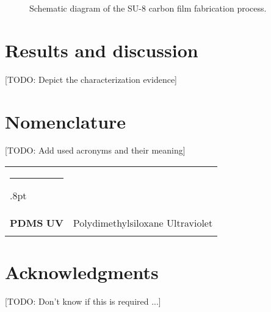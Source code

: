\documentclass[3p,,preprint,12pt]{elsarticle}
\makeatletter
\def\hlinewd#1{%
  \noalign{\ifnum0=`}\fi\hrule \@height #1%
  \futurelet\reserved@a\@xhline}
\def\tbltoprule{\hlinewd{.8pt}\\[-12pt]}
\def\tblbottomrule{\noalign{\vspace*{6pt}}\hline\noalign{\vspace*{2pt}}}
\def\fixFloatSize#1{}%
\makeatother
\begin{document}
\bgroup
\fixFloatSize{images/345cc1b7-01c7-4e66-8e93-81ad0f990362-umethod.png}
\begin{figure*}[!htbp]
\centering \makeatletter{}
\makeatother 
\caption{{Schematic diagram of the SU-8 carbon film fabrication process. }}
\label{f-471d296f0590}
\end{figure*}
\egroup

    
\section{Results and discussion}
[TODO: Depict the characterization evidence]
    
\section{Nomenclature}
[TODO: Add used acronyms and their meaning]
\begin{table}[!htbp]
\def\arraystretch{1}
\ignorespaces 
\centering 
\begin{tabulary}{\linewidth}{LL}
\tbltoprule 
\textbf{PDMS} \mbox{}\protect\newline \textbf{UV} &
  Polydimethylsiloxane \mbox{}\protect\newline Ultraviolet\\
\tblbottomrule 
\end{tabulary}\par 
\end{table}

\section*{Acknowledgments} [TODO: Don't know if this is required ...]
    






\end{document}
